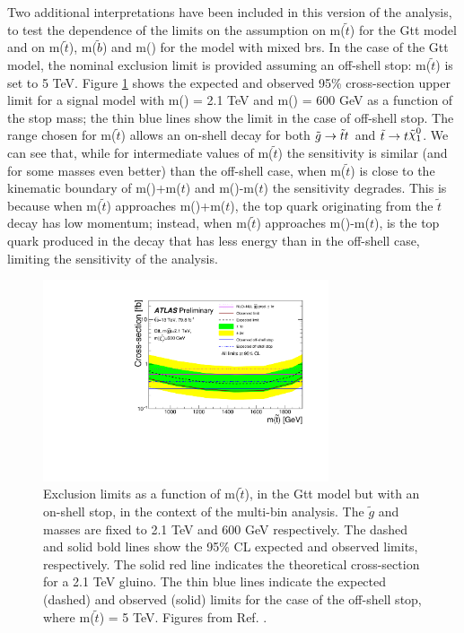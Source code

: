 Two additional interpretations have been included in this version of the analysis, to test the dependence of the limits on the 
assumption on m($\tilde{t}$) for the Gtt model and on m($\tilde{t}$), m($\tilde{b}$) and m(\chinoonepm) for the model with mixed \glspl{br}.
In the case of the Gtt model, the nominal exclusion limit is provided assuming an off-shell stop: m($\tilde{t}$) is set to 5 TeV.
Figure \ref{fig:limits_GttOnshell} shows the expected and observed 95\% cross-section upper limit for a signal model with 
m(\gluino) = 2.1 TeV and m(\ninoone) = 600 GeV as a function of the stop mass; the thin blue lines 
show the limit in the case of off-shell stop. 
The range chosen for  m($\tilde{t}$) allows an on-shell decay for both 
$\tilde{g} \to \tilde{t}t$ and $\tilde{t} \to t \ninoone$. 
We can see that, while for intermediate values of m($\tilde{t}$) the sensitivity is similar (and for some masses even better) 
than the off-shell case, when m($\tilde{t}$) is close to the kinematic boundary of 
m(\ninoone)+m($t$) and m(\gluino)-m($t$) the sensitivity degrades. 
This is because when m($\tilde{t}$) approaches m(\ninoone)+m($t$), the top quark originating from the $\tilde{t}$ decay 
has low momentum; instead, when m($\tilde{t}$) approaches m(\gluino)-m($t$), is the top quark produced in the \gluino 
decay that has less energy than in the off-shell case, limiting the sensitivity of the analysis. 


\begin{figure}
  \centering
  \includegraphics[width=0.75\textwidth]{figures/strong_prod/R21/multibin/Gtt_2100_600_onshell}
  \caption{Exclusion limits as a function of m($\tilde{t}$), in the Gtt model but with an on-shell stop, in the context of the multi-bin analysis. The $\tilde{g}$ and \ninoone masses are fixed to 2.1 TeV and 600 GeV respectively. The dashed and solid bold lines
    show the 95\% CL expected and observed limits, respectively. The solid red line indicates the theoretical cross-section for a 2.1 TeV gluino. The thin blue lines indicate the expected (dashed) and observed (solid) limits for the case of the off-shell stop, where m($\tilde{t}$) = 5 TeV.
    Figures from Ref. \cite{ATLAS-CONF-2018-041}.}
  \label{fig:limits_GttOnshell}
\end{figure}

